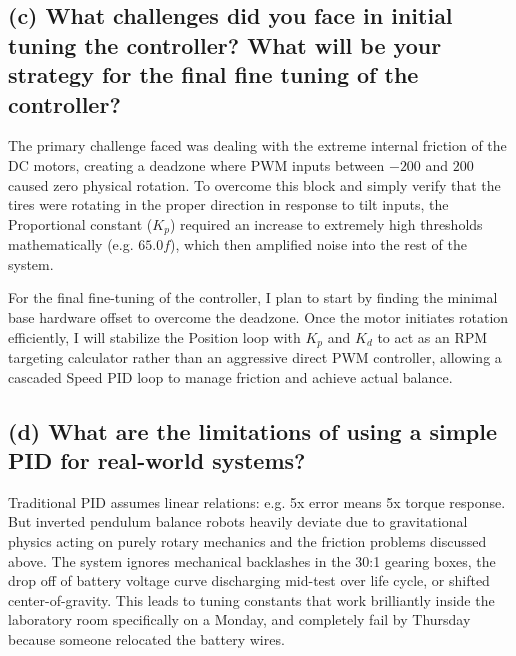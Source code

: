 \documentclass[12pt,a4paper]{article}
\begin{document}
\subsection{(c) What challenges did you face in initial tuning the controller? What will be your strategy for the final fine tuning of the controller?}
The primary challenge faced was dealing with the extreme internal friction of the DC motors, creating a deadzone where PWM inputs between $-200$ and $200$ caused zero physical rotation. To overcome this block and simply verify that the tires were rotating in the proper direction in response to tilt inputs, the Proportional constant ($K_p$) required an increase to extremely high thresholds mathematically (e.g. $65.0f$), which then amplified noise into the rest of the system.

For the final fine-tuning of the controller, I plan to start by finding the minimal base hardware offset to overcome the deadzone. Once the motor initiates rotation efficiently, I will stabilize the Position loop with $K_p$ and $K_d$ to act as an RPM targeting calculator rather than an aggressive direct PWM controller, allowing a cascaded Speed PID loop to manage friction and achieve actual balance.

\subsection{(d) What are the limitations of using a simple PID for real-world systems?}
Traditional PID assumes linear relations: e.g. 5x error means 5x torque response. But inverted pendulum balance robots heavily deviate due to gravitational physics acting on purely rotary mechanics and the friction problems discussed above. The system ignores mechanical backlashes in the 30:1 gearing boxes, the drop off of battery voltage curve discharging mid-test over life cycle, or shifted center-of-gravity. This leads to tuning constants that work brilliantly inside the laboratory room specifically on a Monday, and completely fail by Thursday because someone relocated the battery wires.
\end{document}
